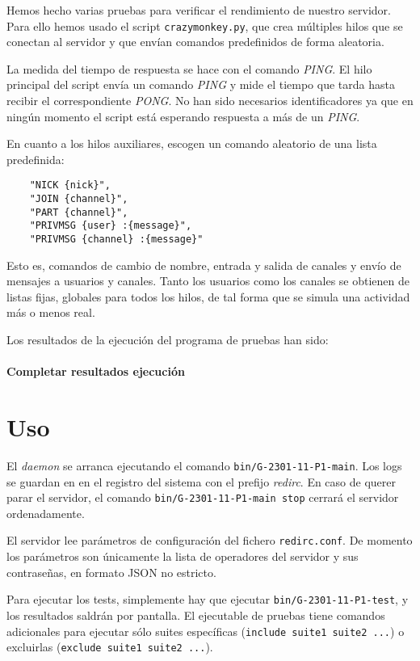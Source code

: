 \documentclass{article}
\begin{document}
Hemos hecho varias pruebas para verificar el rendimiento de nuestro servidor. Para ello hemos usado el script \texttt{crazymonkey.py}, que crea múltiples hilos que se conectan al servidor y que envían comandos predefinidos de forma aleatoria.

La medida del tiempo de respuesta se hace con el comando \textit{PING}. El hilo principal del script envía un comando \textit{PING} y mide el tiempo que tarda hasta recibir el correspondiente \textit{PONG}. No han sido necesarios identificadores ya que en ningún momento el script está esperando respuesta a más de un \textit{PING}.

En cuanto a los hilos auxiliares, escogen un comando aleatorio de una lista predefinida:

\begin{verbatim}
	"NICK {nick}",
	"JOIN {channel}",
	"PART {channel}",
	"PRIVMSG {user} :{message}",
	"PRIVMSG {channel} :{message}"
\end{verbatim}

Esto es, comandos de cambio de nombre, entrada y salida de canales y envío de mensajes a usuarios y canales. Tanto los usuarios como los canales se obtienen de listas fijas, globales para todos los hilos, de tal forma que se simula una actividad más o menos real.

Los resultados de la ejecución del programa de pruebas han sido:

\paragraph{Completar resultados ejecución}

\section{Uso}

El \textit{daemon} se arranca ejecutando el comando \texttt{bin/G-2301-11-P1-main}. Los logs se guardan en en el registro del sistema con el prefijo \textit{redirc}. En caso de querer parar el servidor, el comando \texttt{bin/G-2301-11-P1-main stop} cerrará el servidor ordenadamente.

El servidor lee parámetros de configuración del fichero \texttt{redirc.conf}. De momento los parámetros son únicamente la lista de operadores del servidor y sus contraseñas, en formato JSON no estricto.

Para ejecutar los tests, simplemente hay que ejecutar \texttt{bin/G-2301-11-P1-test}, y los resultados saldrán por pantalla. El ejecutable de pruebas tiene comandos adicionales para ejecutar sólo suites específicas (\texttt{include suite1 suite2 ...}) o excluirlas (\texttt{exclude suite1 suite2 ...}).
\end{document}
